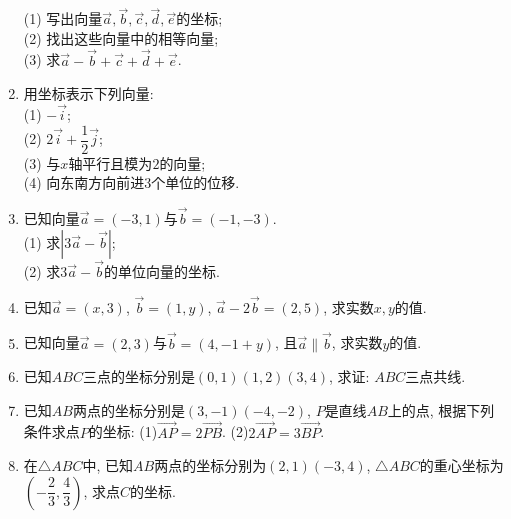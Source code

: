 \documentclass[10pt,a4paper]{article}
\begin{document}
\begin{enumerate}[1.]
\begin{center}
\end{center}
(1) 写出向量$\overrightarrow a,\overrightarrow b,\overrightarrow c,\overrightarrow d,\overrightarrow e$的坐标;\\
(2) 找出这些向量中的相等向量;\\
(3) 求$\overrightarrow a-\overrightarrow b+\overrightarrow c+\overrightarrow d+\overrightarrow e$.
\item 用坐标表示下列向量:\\
(1) $-\overrightarrow i$;\\
(2) $2\overrightarrow i+\dfrac 12\overrightarrow j$;\\
(3) 与$x$轴平行且模为$2$的向量;\\
(4) 向东南方向前进$3$个单位的位移.
\item 已知向量$\overrightarrow a=(-3,1)$与$\overrightarrow b=(-1,-3)$.\\
(1) 求$|3\overrightarrow a-\overrightarrow b|$;\\
(2) 求$3\overrightarrow a-\overrightarrow b$的单位向量的坐标.
\item 已知$\overrightarrow a=(x,3)$, $\overrightarrow b=(1,y)$, $\overrightarrow a-2\overrightarrow b=(2,5)$, 求实数$x,y$的值.
\item 已知向量$\overrightarrow a=(2,3)$与$\overrightarrow b=(4,-1+y)$, 且$\overrightarrow a\parallel \overrightarrow b$, 求实数$y$的值.
\item 已知$ABC$三点的坐标分别是$(0,1)(1,2)(3,4)$, 求证: $ABC$三点共线.
\item 已知$AB$两点的坐标分别是$(3,-1)(-4,-2)$, $P$是直线$AB$上的点, 根据下列条件求点$P$的坐标:
(1)$\overrightarrow{AP}=2\overrightarrow{PB}$. (2)$2\overrightarrow{AP}=3\overrightarrow{BP}$.
\item 在$\triangle ABC$中, 已知$AB$两点的坐标分别为$(2,1)(-3,4)$, $\triangle ABC$的重心坐标为$(-\dfrac 23,\dfrac 43)$, 求点$C$的坐标.

\end{enumerate}
\end{document}
